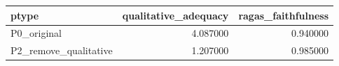\begin{tabular}{lrr}
\toprule
ptype & qualitative_adequacy & ragas_faithfulness \\
\midrule
P0_original & 4.087000 & 0.940000 \\
P2_remove_qualitative & 1.207000 & 0.985000 \\
\bottomrule
\end{tabular}

